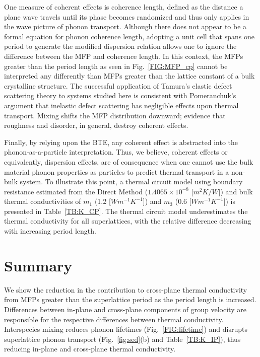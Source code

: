 \documentclass[aps,prb,preprint,preprintnumbers,amsmath,amssymb,floatfix,superscriptaddress]{revtex4}
\begin{document}
One measure of coherent effects is coherence length, defined as the distance a plane wave travels until its phase becomes randomized and thus only applies in the wave picture of phonon transport. Although there does not appear to be a formal equation for phonon coherence length, adopting a unit cell that spans one period to generate the modified dispersion relation allows one to ignore the difference between the MFP and coherence length.\cite{PhysRevB.67.195311} In this context, the MFPs greater than the period length as seen in Fig.~\ref{FIG:MFP_cp} cannot be interpreted any differently than MFPs greater than the lattice constant of a bulk crystalline structure. The successful application of Tamura's elastic defect scattering theory to systems studied here is consistent with Pomeranchuk's argument that inelastic defect scattering has negligible effects upon thermal transport.\cite{pomeranchuk1942thermal} Mixing shifts the MFP distribution downward; evidence that roughness and disorder, in general, destroy coherent effects.\cite{PhysRevB.67.195311,dames_682} 

Finally, by relying upon the BTE, any coherent effect is abstracted into the phonon-as-a-particle interpretation. Thus, we believe, coherent effects or equivalently, dispersion effects, are of consequence when one cannot use the bulk material phonon properties as particles to predict thermal transport in a non-bulk system. To illustrate this point, a thermal circuit model using boundary resistance estimated from the Direct Method ($1.4065\times10^{-8}$ [$m^2K/W$]) and bulk thermal conductivities of $m_1$ (1.2 [$Wm^{-1}K^{-1}$]) and $m_3$ (0.6 [$Wm^{-1}K^{-1}$]) is presented in Table~\ref{TB:K_CP}. The thermal circuit model underestimates the thermal conductivity for all superlattices, with the relative difference decreasing with increasing period length.

\section{Summary}

We show the reduction in the contribution to cross-plane thermal conductivity from MFPs greater than the superlattice period as the period length is increased. Differences between in-plane and cross-plane components of group velocity are responsible for the respective differences between thermal conductivity. Interspecies mixing reduces phonon lifetimes (Fig.~\ref{FIG:lifetime}) and disrupts superlattice phonon transport (Fig.~\ref{fig:sed}(b) and Table~\ref{TB:K_IP}), thus reducing in-plane and cross-plane thermal conductivity.

\newpage


\end{document}
